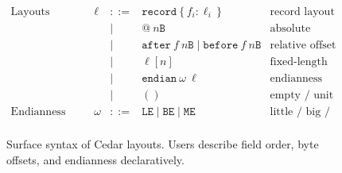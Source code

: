 \begin{figure}[h]
\[
\begin{array}{llclr}
  \textrm{Layouts (surface syntax)} 
     & \ell & ::=  & \texttt{record}\ \{\, f_i : \ell_i \,\}        & \textrm{record layout} \\
     &      & \mid & @\ n\texttt{B}                                 & \textrm{absolute offset (bytes)} \\
     &      & \mid & \texttt{after}\ f\ n\texttt{B} \mid \texttt{before}\ f\ n\texttt{B} 
                                                          & \textrm{relative offset} \\
     &      & \mid & \ell [n]                                       & \textrm{fixed-length array} \\
     &      & \mid & \texttt{endian}\ \omega\ \ell                  & \textrm{endianness annotation} \\
     &      & \mid & ()                                             & \textrm{empty / unit layout} \\
  \textrm{Endianness} & \omega & ::= & \texttt{LE} \mid \texttt{BE} \mid \texttt{ME} & \textrm{little / big / machine} \\
\end{array}
\]
\caption{Surface syntax of Cedar layouts. Users describe field order, byte offsets, and endianness declaratively.}
\label{fig:cedar-surface}
\end{figure}
